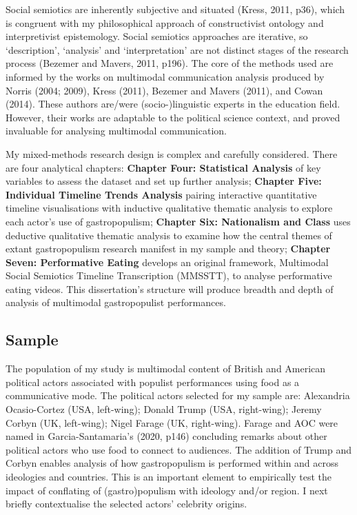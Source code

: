 \documentclass[a4paper, nobind]{templates/ociamthesis}
\begin{document}
Social semiotics are inherently subjective and situated (Kress, 2011, p36), which is congruent with my philosophical approach of constructivist ontology and interpretivist epistemology. Social semiotics approaches are iterative, so `description', `analysis' and `interpretation' are not distinct stages of the research process (Bezemer and Mavers, 2011, p196). The core of the methods used are informed by the works on multimodal communication analysis produced by Norris (2004; 2009), Kress (2011), Bezemer and Mavers (2011), and Cowan (2014). These authors are/were (socio-)linguistic experts in the education field. However, their works are adaptable to the political science context, and proved invaluable for analysing multimodal communication.

My mixed-methods research design is complex and carefully considered. There are four analytical chapters: \textbf{Chapter Four: Statistical Analysis} of key variables to assess the dataset and set up further analysis; \textbf{Chapter Five: Individual Timeline Trends Analysis} pairing interactive quantitative timeline visualisations with inductive qualitative thematic analysis to explore each actor's use of gastropopulism; \textbf{Chapter Six: Nationalism and Class} uses deductive qualitative thematic analysis to examine how the central themes of extant gastropopulism research manifest in my sample and theory; \textbf{Chapter Seven: Performative Eating} develops an original framework, Multimodal Social Semiotics Timeline Transcription (MMSSTT), to analyse performative eating videos. This dissertation's structure will produce breadth and depth of analysis of multimodal gastropopulist performances.

\hypertarget{sample}{%
\subsection*{Sample}\label{sample}}

The population of my study is multimodal content of British and American political actors associated with populist performances using food as a communicative mode. The political actors selected for my sample are: Alexandria Ocasio-Cortez (USA, left-wing); Donald Trump (USA, right-wing); Jeremy Corbyn (UK, left-wing); Nigel Farage (UK, right-wing). Farage and AOC were named in Garcia-Santamaria's (2020, p146) concluding remarks about other political actors who use food to connect to audiences. The addition of Trump and Corbyn enables analysis of how gastropopulism is performed within and across ideologies and countries. This is an important element to empirically test the impact of conflating of (gastro)populism with ideology and/or region. I next briefly contextualise the selected actors' celebrity origins.
\end{document}
